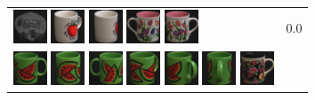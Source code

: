 \begin{figure}[!bp]
\begin{tabular}{m{11cm} | m{3cm} |}
\includegraphics[width=1cm]{coil/beeld-29.eps}
\includegraphics[width=1cm]{coil/beeld-39.eps}
\includegraphics[width=1cm]{coil/beeld-38.eps}
\includegraphics[width=1cm]{coil/beeld-7.eps}
\includegraphics[width=1cm]{coil/beeld-6.eps}
& {\scriptsize 0.0}
\\
\includegraphics[width=1cm]{coil/beeld-30.eps}
\includegraphics[width=1cm]{coil/beeld-32.eps}
\includegraphics[width=1cm]{coil/beeld-31.eps}
\includegraphics[width=1cm]{coil/beeld-33.eps}
\includegraphics[width=1cm]{coil/beeld-34.eps}
\includegraphics[width=1cm]{coil/beeld-35.eps}
\includegraphics[width=1cm]{coil/beeld-60.eps}

\end{tabular}
\end{figure}
